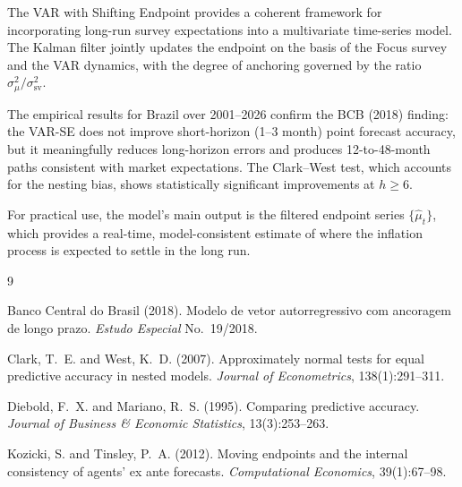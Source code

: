 \documentclass[12pt, a4paper]{article}
\begin{document}
The VAR with Shifting Endpoint provides a coherent framework for
incorporating long-run survey expectations into a multivariate time-series
model. The Kalman filter jointly updates the endpoint on the basis of the
Focus survey and the VAR dynamics, with the degree of anchoring governed
by the ratio $\sigma^2_\mu / \sigma^2_{\mathrm{sv}}$.

The empirical results for Brazil over 2001--2026 confirm the BCB (2018)
finding: the VAR-SE does not improve short-horizon (1--3 month) point
forecast accuracy, but it meaningfully reduces long-horizon errors and
produces 12-to-48-month paths consistent with market expectations. The
Clark--West test, which accounts for the nesting bias, shows statistically
significant improvements at $h \geq 6$.

For practical use, the model's main output is the filtered endpoint series
$\{\hat\mu_t\}$, which provides a real-time, model-consistent estimate of
where the inflation process is expected to settle in the long run.


\begin{thebibliography}{9}

Banco Central do Brasil (2018).
\newblock Modelo de vetor autorregressivo com ancoragem de longo prazo.
\newblock \emph{Estudo Especial} No.\ 19/2018.

Clark, T.~E. and West, K.~D. (2007).
\newblock Approximately normal tests for equal predictive accuracy in nested
  models.
\newblock \emph{Journal of Econometrics}, 138(1):291--311.

Diebold, F.~X. and Mariano, R.~S. (1995).
\newblock Comparing predictive accuracy.
\newblock \emph{Journal of Business \& Economic Statistics}, 13(3):253--263.

Kozicki, S. and Tinsley, P.~A. (2012).
\newblock Moving endpoints and the internal consistency of agents' ex ante
  forecasts.
\newblock \emph{Computational Economics}, 39(1):67--98.

\end{thebibliography}
\end{document}
